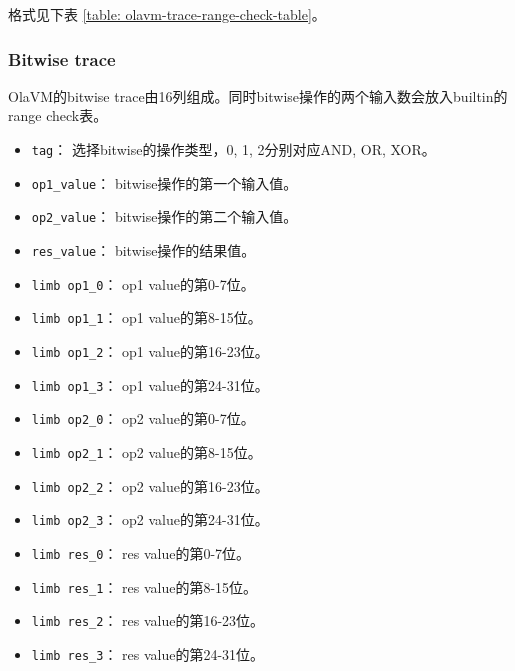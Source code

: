 格式见下表 \ref{table: olavm-trace-range-check-table}。

\begin{table}[!ht]
    \centering {}
    \caption{OlaVM的range check的trace表结构}
    \label{table: olavm-trace-range-check-table}
\end{table}

\subsubsection{Bitwise trace}\label{subsubsec: olavm-bitwise-trace}
OlaVM的bitwise trace由16列组成。同时bitwise操作的两个输入数会放入builtin的range check表。
\begin{itemize}
    \item \verb|tag|： 选择bitwise的操作类型，0, 1, 2分别对应AND, OR, XOR。
    \item \verb|op1_value|： bitwise操作的第一个输入值。
    \item \verb|op2_value|： bitwise操作的第二个输入值。
    \item \verb|res_value|： bitwise操作的结果值。
    \item \verb|limb op1_0|： op1 value的第0-7位。
    \item \verb|limb op1_1|： op1 value的第8-15位。
    \item \verb|limb op1_2|： op1 value的第16-23位。
    \item \verb|limb op1_3|： op1 value的第24-31位。
    \item \verb|limb op2_0|： op2 value的第0-7位。
    \item \verb|limb op2_1|： op2 value的第8-15位。
    \item \verb|limb op2_2|： op2 value的第16-23位。
    \item \verb|limb op2_3|： op2 value的第24-31位。
    \item \verb|limb res_0|： res value的第0-7位。
    \item \verb|limb res_1|： res value的第8-15位。
    \item \verb|limb res_2|： res value的第16-23位。
    \item \verb|limb res_3|： res value的第24-31位。
\end{itemize}

